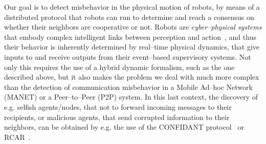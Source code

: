 \documentclass[journal, onecolumn, 12pt]{styles/IEEEtran}
\begin{document}
%
%
%
Our goal is to detect misbehavior in the physical motion of robots, by means of a distributed protocol that robots can run to determine and reach a consensus on whether their neighbors are cooperative or not. Robots are {\em cyber--physical systems} that embody complex intelligent links between perception and action~\cite{Brady198579}, and thus their behavior is inherently determined by real--time physical dynamics, that give inputs to and receive outputs from their event--based supervisory systems. Not only this requires the use of a  hybrid dynamic formalism, such as the one described above, but it also makes the problem we deal with much more complex than the detection of communication misbehavior in a Mobile Ad--hoc Network (MANET) or a Peer--to--Peer (P2P) system. In this last context, the discovery of e.g. selfish agents/nodes, that not to forward incoming messages to their recipients, or malicious agents, that send corrupted information to their neighbors, can be obtained by e.g. the use of the CONFIDANT protocol~\cite{buchegger2002pac} or RCAR~\cite{Dini20121167}. 
\end{document}
